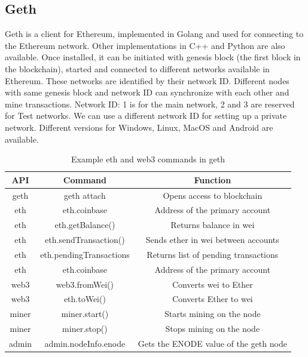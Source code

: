 \documentclass[11pt,openright]{report}
\begin{document}
\subsection{Geth}
Geth is a client for Ethereum, implemented in Golang and used for connecting to the Ethereum network. Other implementations in C++ and Python are also available. Once installed, it can be initiated with genesis block (the first block in the blockchain), started and connected to different networks available in Ethereum. These networks are identified by their network ID. Different nodes with same genesis block and network ID can synchronize with each other and mine transactions. Network ID: 1 is for the main network, 2 and 3 are reserved for Test networks. We can use a different network ID for setting up a private network. Different versions for Windows, Linux, MacOS and Android are available.

\begin{table}[!htbp]
	\renewcommand{\arraystretch}{1.3}
	\caption{Example eth and web3 commands in geth}
	\label{geth_commands}
	\centering
	\begin{tabular}{|c|c|c|}
		\hline
		\bfseries API & \bfseries Command & \bfseries Function \\
		\hline\hline
		geth & geth attach & Opens access to blockchain \\ \hline
		eth & eth.coinbase & Address of the primary account \\ \hline
		eth & eth.getBalance() & Returns balance in wei \\ \hline
        eth & eth.sendTransaction() & Sends ether in wei between accounts \\ \hline
        eth & eth.pendingTransactions & Returns list of pending transactions\\ \hline
        eth & eth.coinbase & Address of the primary account \\ \hline
        web3 & web3.fromWei() & Converts wei to Ether \\ \hline
        web3 & eth.toWei() & Converts Ether to wei \\ \hline
        miner & miner.start() & Starts mining on the node \\ \hline
        miner & miner.stop() & Stops mining on the node \\ \hline
        admin & admin.nodeInfo.enode & Gets the ENODE value of the geth node \\ \hline
	\end{tabular}
\end{table}
\end{document}
